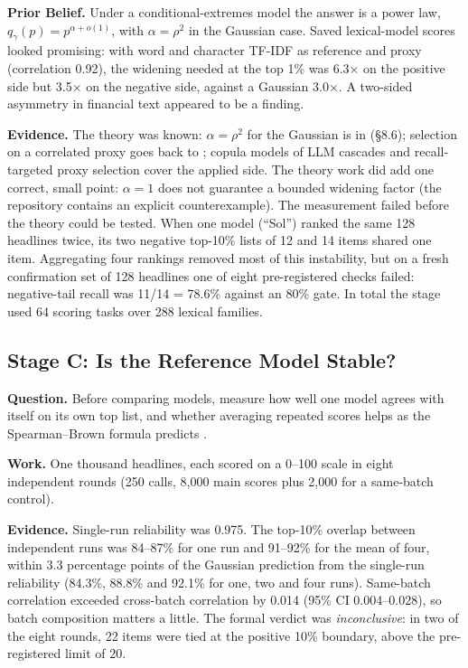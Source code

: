 \documentclass[11pt]{article}
\begin{document}
\textbf{Prior Belief.} Under a conditional-extremes model the answer is a power law, $q_\gamma(p)=p^{\alpha+o(1)}$, with $\alpha=\rho^2$ in the Gaussian case. Saved lexical-model scores looked promising: with word and character TF-IDF as reference and proxy (correlation 0.92), the widening needed at the top 1\% was 6.3$\times$ on the positive side but 3.5$\times$ on the negative side, against a Gaussian 3.0$\times$. A two-sided asymmetry in financial text appeared to be a finding.

\textbf{Evidence.} The theory was known: $\alpha=\rho^2$ for the Gaussian is in \citet{heffernan2004conditional} (\S8.6); selection on a correlated proxy goes back to \citet{taylor1939relationship}; copula models of LLM cascades \citep{zellinger2025rational} and recall-targeted proxy selection \citep{kang2020supg,zeighami2025cut} cover the applied side. The theory work did add one correct, small point: $\alpha=1$ does not guarantee a bounded widening factor (the repository contains an explicit counterexample). The measurement failed before the theory could be tested. When one model (``Sol'') ranked the same 128 headlines twice, its two negative top-10\% lists of 12 and 14 items shared one item. Aggregating four rankings removed most of this instability, but on a fresh confirmation set of 128 headlines one of eight pre-registered checks failed: negative-tail recall was 11/14 = 78.6\% against an 80\% gate. In total the stage used 64 scoring tasks over 288 lexical families.

\subsection{Stage C: Is the Reference Model Stable?}

\textbf{Question.} Before comparing models, measure how well one model agrees with itself on its own top list, and whether averaging repeated scores helps as the Spearman--Brown formula predicts \citep{spearman1910correlation,brown1910some}.

\textbf{Work.} One thousand headlines, each scored on a 0--100 scale in eight independent rounds (250 calls, 8,000 main scores plus 2,000 for a same-batch control).

\textbf{Evidence.} Single-run reliability was 0.975. The top-10\% overlap between independent runs was 84--87\% for one run and 91--92\% for the mean of four, within 3.3 percentage points of the Gaussian prediction from the single-run reliability (84.3\%, 88.8\% and 92.1\% for one, two and four runs). Same-batch correlation exceeded cross-batch correlation by 0.014 (95\% CI 0.004--0.028), so batch composition matters a little. The formal verdict was \emph{inconclusive}: in two of the eight rounds, 22 items were tied at the positive 10\% boundary, above the pre-registered limit of 20.
\end{document}
